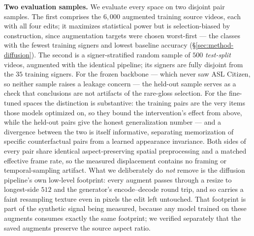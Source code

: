 \textbf{Two evaluation samples.} We evaluate every space on two disjoint
pair samples. The first comprises the $6{,}000$ augmented training source
videos, each with all four edits; it maximizes statistical power but is
selection-biased by construction, since augmentation targets were chosen
worst-first --- the classes with the fewest training signers and lowest
baseline accuracy (\S\ref{sec:method-diffusion}). The second is a
signer-stratified random sample of $500$ \emph{test-split} videos, augmented
with the identical pipeline; its signers are fully disjoint from the $35$
training signers. For the frozen backbone --- which never saw ASL Citizen,
so neither sample raises a leakage concern --- the held-out sample serves as
a check that conclusions are not artifacts of the rare-gloss selection. For
the fine-tuned spaces the distinction is substantive: the training pairs are
the very items those models optimized on, so they bound the intervention's
effect from above, while the held-out pairs give the honest generalization
number --- and a divergence between the two is itself informative,
separating memorization of specific counterfactual pairs from a learned
appearance invariance. Both sides of every pair share identical
aspect-preserving spatial preprocessing and a matched effective frame rate,
so the measured displacement contains no framing or temporal-sampling
artifact. What we deliberately do \emph{not} remove is the diffusion
pipeline's own low-level footprint: every augment passes through a resize to
longest-side $512$ and the generator's encode--decode round trip, and so
carries a faint resampling texture even in pixels the edit left untouched.
That footprint is part of the synthetic signal being measured, because any
model trained on these augments consumes exactly the same footprint; we
verified separately that the saved augments preserve the source aspect
ratio.

